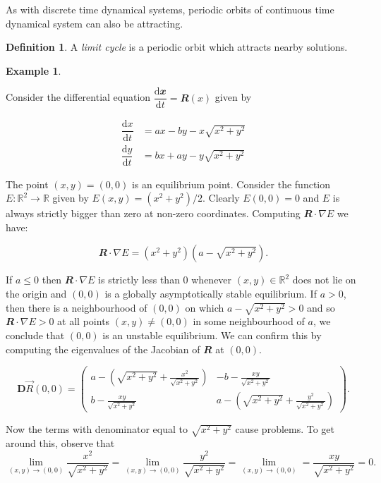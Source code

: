 \documentclass[
  a4paper,
  oneside,
  final]{krantz}
\newcommand{\R}{\mathbb{R}}
\renewcommand{\d}{\mathrm{d}}
\renewcommand{\v}[1]{{\mathbfit{#1}}}
\newcommand{\der}[2]{\dfrac{\d #1}{\d #2}}
\newcommand{\jacobr}{\mathbf{D}\vec{R}}
\theoremstyle{definition}
\newtheorem{definition}{Definition}[chapter]
\theoremstyle{definition}
\newtheorem{example}{Example}[chapter]
\theoremstyle{definition}
\theoremstyle{definition}
\theoremstyle{remark}
\begin{document}
As with discrete time dynamical systems, periodic orbits of continuous time dynamical system can also be attracting.

\begin{definition}
A \emph{limit cycle} is a periodic orbit which attracts nearby solutions.
\end{definition}

\begin{example}
\protect\hypertarget{exm:spiralexampleII}{}\label{exm:spiralexampleII}

Consider the differential equation \(\der{\v{x}}{t} = \v{R}(x)\) given by

\begin{align}
 \der{x}{t} &= ax -by - x \sqrt{x^2 + y^2} \\
 \der{y}{t} &= bx +ay -y \sqrt{x^2+y^2} 
 \label{eq:ode2d}
\end{align}

The point \((x,y) = (0,0)\) is an equilibrium point. Consider the function \(E: \R^2 \to \R\) given by \(E(x,y) = (x^2 + y^2)/2\). Clearly \(E(0,0) = 0\) and \(E\) is always strictly bigger than zero at non-zero coordinates. Computing \(\v{R} \cdot \nabla E\) we have:

\[\v{R} \cdot \nabla E = (x^2 +y^2)\left(a- \sqrt{x^2 + y^2}\right).\]

If \(a\le 0\) then \(\v{R} \cdot \nabla E\) is strictly less than \(0\) whenever \((x,y) \in \R^2\) does not lie on the origin and \((0,0)\) is a globally asymptotically stable equilibrium. If \(a>0\), then there is a neighbourhood of \((0,0)\) on which \(a - \sqrt{x^2 + y^2} >0\) and so \(\v{R} \cdot \nabla E >0\) at all points \((x,y) \ne (0,0)\) in some neighbourhood of \(a\), we conclude that \((0,0)\) is an unstable equilibrium. We can confirm this by computing the eigenvalues of the Jacobian of \(\v{R}\) at \((0,0)\).

\[
\jacobr(0,0) = \begin{pmatrix} a - \left( \sqrt{x^2 + y^2} + \frac{x^2}{\sqrt{x^2 + y^2}}  \right) & -b - \frac{xy}{\sqrt{x^2 + y^2}} \\ b - \frac{xy}{\sqrt{x^2 + y^2}} & a - \left( \sqrt{x^2 + y^2} + \frac{y^2}{\sqrt{x^2 +y^2}}  \right)   \end{pmatrix}
.\]

Now the terms with denominator equal to \(\sqrt{x^2 + y^2}\) cause problems. To get around this, observe that \[\lim_{(x,y) \to (0,0)} \frac{x^2}{\sqrt{x^2 + y^2}} = \lim_{(x,y) \to (0,0)} \frac{y^2}{\sqrt{x^2 + y^2}} = \lim_{(x,y) \to (0,0)}= \frac{xy}{\sqrt{x^2 + y^2}} = 0.\]


\end{example}
\end{document}
